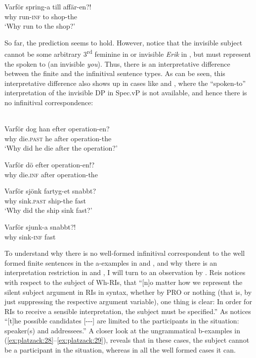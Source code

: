 \documentclass[output=paper]{LSP/langsci}
\begin{document}
   \ex
\gll Varför  spring-a  till    affär-en?!\\
      why    run-\textsc{inf}  to    shop-the\\
\glt   ‘Why run to the shop?’  
\z
\z

So far, the prediction seems to hold. However, notice that the invisible subject cannot be some arbitrary 3\textsuperscript{rd}  feminine in  or invisible \textit{Erik} in , but must represent the  spoken to (an invisible \textit{you}). Thus, there is an interpretative difference between the finite and the infinitival sentence types. As can be seen, this interpretative difference also shows up in cases like  and , where the “spoken-to” interpretation of the invisible DP in Spec.vP is not available, and hence there is no infinitival correspondence: 

\ea \label{ex:platzack:28}
 \\
   \ea
\gll Varför  dog    han  efter  operation-en?\\
      why    die.\textsc{past}  he    after  operation-the\\
\glt   ‘Why   did he die after the operation?’

   \ex
\gll *Varför  dö      efter  operation-en!?\\
      why    die.\textsc{inf}  after  operation-the\\
\z
\z
      
\ea%
  \label{ex:platzack:29}
	 \ea
\gll Varför  sjönk      fartyg-et  snabbt?\\
      why    sink.\textsc{past}  ship-the  fast\\
\glt   ‘Why did the ship sink fast?’

   \ex
\gll *Varför  sjunk-a  snabbt?!\\
      why    sink-\textsc{inf}  fast  \\
\z
\z

To understand why there is no well-formed infinitival correspondent to the well form\-ed finite sentences in the a-examples in  and , and why there is an interpretation restriction in  and , I will turn to an observation by \citet[186]{Reis2003}. Reis notices with respect to the subject of Wh-RIs, that “[n]o matter how we represent the silent subject argument in RIs in syntax, whether by PRO or nothing (that is, by just suppressing the respective argument variable), one thing is clear: In order for RIs to receive a sensible  interpretation, the subject  must be specified.” As \citet[186]{Reis2003} notices  “[t]he possible candidates [-{}-{}-] are limited to the participants in the  situation: speaker(s) and addressees.” A closer look at the ungrammatical b-examples in (\ref{ex:platzack:28}--\ref{ex:platzack:29}), reveals that in these cases, the subject  cannot be a participant in the  situation, whereas in all the well formed cases it can.
\end{document}
